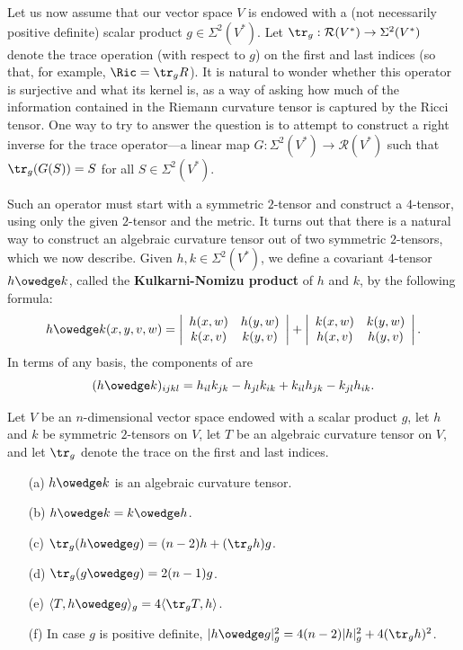 Let us now assume that our vector space $V$ is endowed with a (not necessarily positive definite) scalar product $g\in\Sigma^2(V^*)$. Let $\tr_g:\mathcal{R}(V^*)\to\Sigma^2(V^*)$ denote the trace operation (with respect to $g$) on the first and last indices (so that, for example, $\Ric=\tr_gR$). It is natural to wonder whether this operator is surjective and what its kernel is, as a way of asking how much of the information contained in the Riemann curvature tensor is captured by the Ricci tensor. One way to try to answer the question is to attempt to construct a right inverse for the trace operator---a linear map $G:\Sigma^2(V^*)\to\mathcal{R}(V^*)$ such that $\tr_g(G(S))=S$ for all $S\in\Sigma^2(V^*)$.\par
Such an operator must start with a symmetric $2$-tensor and construct a $4$-tensor, using only the given $2$-tensor and the metric. It turns out that there is a natural way to construct an algebraic curvature tensor out of two symmetric $2$-tensors, which we now describe. Given $h,k\in\Sigma^2(V^*)$, we define a covariant $4$-tensor $h\owedge k$, called the \textbf{Kulkarni-Nomizu product} of $h$ and $k$, by the following formula:
\[h\owedge k(x,y,v,w)=\left|\begin{array}{cc}
h(x,w)&h(y,w)\\
k(x,v)&k(y,v)
\end{array}\right|+\left|\begin{array}{cc}
k(x,w)&k(y,w)\\
h(x,v)&h(y,v)
\end{array}\right|.\]
In terms of any basis, the components of   are
\[(h\owedge k)_{ijkl}=h_{il}k_{jk}-h_{jl}k_{ik}+k_{il}h_{jk}-k_{jl}h_{ik}.\]
\begin{lemma}\label{Riemann Kulkarni-Nomizu prop}
Let $V$ be an $n$-dimensional vector space endowed with a scalar product $g$, let $h$ and $k$ be symmetric $2$-tensors on $V$, let $T$ be an algebraic curvature tensor 
on $V$, and let $\tr_g$ denote the trace on the first and last indices.
\begin{itemize}
\item[(a)] $h\owedge k$ is an algebraic curvature tensor.
\item[(b)] $h\owedge k=k\owedge h$.
\item[(c)] $\tr_g(h\owedge g)=(n-2)h+(\tr_gh)g$.
\item[(d)] $\tr_g(g\owedge g)=2(n-1)g$.
\item[(e)] $\langle T,h\owedge g\rangle_g=4\langle\tr_gT,h\rangle$.
\item[(f)] In case $g$ is positive definite, $|h\owedge g|_g^2=4(n-2)|h|_g^2+4(\tr_gh)^2$.
\end{itemize}
\end{lemma}
